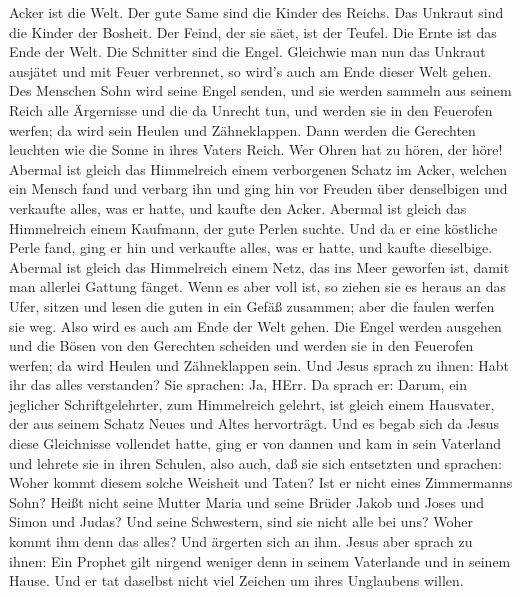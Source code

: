 Acker ist die Welt. Der gute Same sind die Kinder des Reichs. Das
Unkraut sind die Kinder der Bosheit.  Der Feind, der sie
säet, ist der Teufel. Die Ernte ist das Ende der Welt. Die Schnitter
sind die Engel.  Gleichwie man nun das Unkraut ausjätet und
mit Feuer verbrennet, so wird's auch am Ende dieser Welt gehen.
 Des Menschen Sohn wird seine Engel senden, und sie werden
sammeln aus seinem Reich alle Ärgernisse und die da Unrecht tun,
 und werden sie in den Feuerofen werfen; da wird sein
Heulen und Zähneklappen.  Dann werden die Gerechten
leuchten wie die Sonne in ihres Vaters Reich. Wer Ohren hat zu hören,
der höre!  Abermal ist gleich das Himmelreich einem
verborgenen Schatz im Acker, welchen ein Mensch fand und verbarg ihn und
ging hin vor Freuden über denselbigen und verkaufte alles, was er hatte,
und kaufte den Acker.  Abermal ist gleich das Himmelreich
einem Kaufmann, der gute Perlen suchte.  Und da er eine
köstliche Perle fand, ging er hin und verkaufte alles, was er hatte, und
kaufte dieselbige.  Abermal ist gleich das Himmelreich
einem Netz, das ins Meer geworfen ist, damit man allerlei Gattung
fänget.  Wenn es aber voll ist, so ziehen sie es heraus an
das Ufer, sitzen und lesen die guten in ein Gefäß zusammen; aber die
faulen werfen sie weg.  Also wird es auch am Ende der Welt
gehen. Die Engel werden ausgehen und die Bösen von den Gerechten
scheiden  und werden sie in den Feuerofen werfen; da wird
Heulen und Zähneklappen sein.  Und Jesus sprach zu ihnen:
Habt ihr das alles verstanden? Sie sprachen: Ja, HErr.  Da
sprach er: Darum, ein jeglicher Schriftgelehrter, zum Himmelreich
gelehrt, ist gleich einem Hausvater, der aus seinem Schatz Neues und
Altes hervorträgt.  Und es begab sich da Jesus diese
Gleichnisse vollendet hatte, ging er von dannen  und kam in
sein Vaterland und lehrete sie in ihren Schulen, also auch, daß sie sich
entsetzten und sprachen: Woher kommt diesem solche Weisheit und Taten?
 Ist er nicht eines Zimmermanns Sohn? Heißt nicht seine
Mutter Maria und seine Brüder Jakob und Joses und Simon und Judas?
 Und seine Schwestern, sind sie nicht alle bei uns? Woher
kommt ihm denn das alles?  Und ärgerten sich an ihm. Jesus
aber sprach zu ihnen: Ein Prophet gilt nirgend weniger denn in seinem
Vaterlande und in seinem Hause.  Und er tat daselbst nicht
viel Zeichen um ihres Unglaubens willen.

